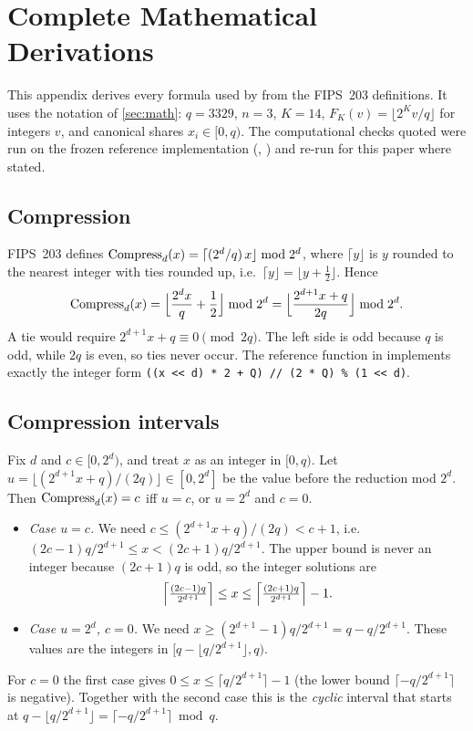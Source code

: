 \section{Complete Mathematical Derivations}\label{app:math}
This appendix derives every formula used by \PAMS{} from the FIPS~203 definitions. It uses the notation of \cref{sec:math}: $q = 3329$, $n = 3$, $K = 14$, $F_K(v) = \lfloor 2^K v/q \rfloor$ for integers $v$, and canonical shares $x_i \in [0, q)$. The computational checks quoted were run on the frozen reference implementation (, ) and re-run for this paper where stated.

\subsection{Compression}\label{app:math-compress}
FIPS~203 defines $\operatorname{Compress}_d(x) = \lceil (2^d/q)\,x \rfloor \bmod 2^d$, where $\lceil y \rfloor$ is $y$ rounded to the nearest integer with ties rounded up, i.e.\ $\lceil y \rfloor = \lfloor y + \tfrac12 \rfloor$. Hence
\begin{equation}
  \operatorname{Compress}_d(x) = \Bigl\lfloor \frac{2^d x}{q} + \frac12 \Bigr\rfloor \bmod 2^d = \Bigl\lfloor \frac{2^{d+1} x + q}{2q} \Bigr\rfloor \bmod 2^d .
\end{equation}
A tie would require $2^{d+1}x + q \equiv 0 \pmod{2q}$. The left side is odd because $q$ is odd, while $2q$ is even, so ties never occur. The reference function  in  implements exactly the integer form \texttt{((x << d) * 2 + Q) // (2 * Q) \% (1 << d)}.

\subsection{Compression intervals}\label{app:math-intervals}
Fix $d$ and $c \in [0, 2^d)$, and treat $x$ as an integer in $[0, q)$. Let $u = \lfloor (2^{d+1}x + q)/(2q) \rfloor \in [0, 2^d]$ be the value before the reduction mod $2^d$. Then $\operatorname{Compress}_d(x) = c$ iff $u = c$, or $u = 2^d$ and $c = 0$.
\begin{itemize}
  \item \emph{Case $u = c$.} We need $c \le (2^{d+1}x + q)/(2q) < c + 1$, i.e.\ $(2c - 1)q/2^{d+1} \le x < (2c + 1)q/2^{d+1}$. The upper bound is never an integer because $(2c+1)q$ is odd, so the integer solutions are
  \[ \Bigl\lceil \tfrac{(2c-1)q}{2^{d+1}} \Bigr\rceil \le x \le \Bigl\lceil \tfrac{(2c+1)q}{2^{d+1}} \Bigr\rceil - 1 . \]
  \item \emph{Case $u = 2^d$, $c = 0$.} We need $x \ge (2^{d+1} - 1)q/2^{d+1} = q - q/2^{d+1}$. These values are the integers in $[q - \lfloor q/2^{d+1} \rfloor, q)$.
\end{itemize}
For $c = 0$ the first case gives $0 \le x \le \lceil q/2^{d+1} \rceil - 1$ (the lower bound $\lceil -q/2^{d+1} \rceil$ is negative). Together with the second case this is the \emph{cyclic} interval that starts at $q - \lfloor q/2^{d+1} \rfloor = \lceil -q/2^{d+1} \rceil \bmod q$.

